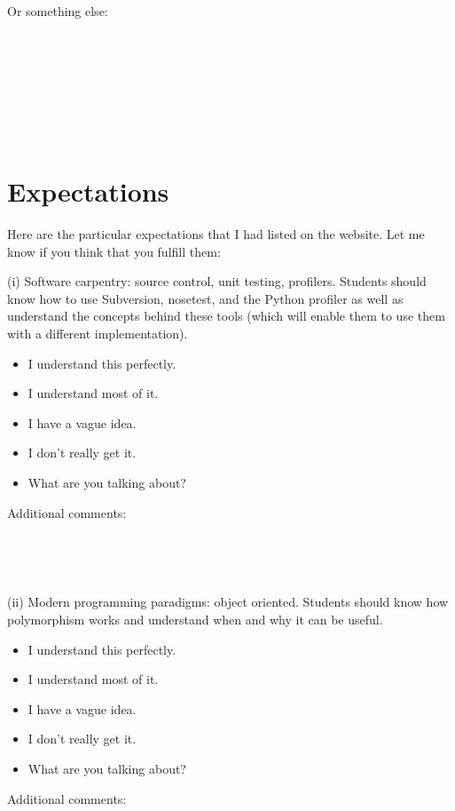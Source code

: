 \documentclass[article,twoside]{memoir}
\newcommand*{\fillunderscore}{~\hrulefill}
\newcommand*{\checkbox}{$\square$}
\begin{document}
Or something else:\par
\fillunderscore\par
\fillunderscore\par
\fillunderscore\par
\fillunderscore\par

\section{Expectations}
Here are the particular expectations that I had listed on the website. Let me know if you think that you fulfill them:

    (i) Software carpentry: source control, unit testing, profilers. Students should know how to use Subversion, nosetest, and the Python profiler as well as understand the concepts behind these tools (which will enable them to use them with a different implementation).

\begin{itemize}[\checkbox]
\item I understand this perfectly.
\item I understand most of it.
\item I have a vague idea.
\item I don't really get it.
\item What are you talking about?
\end{itemize}
Additional comments:
\fillunderscore\par
\fillunderscore\par
\fillunderscore\par

    (ii) Modern programming paradigms: object oriented. Students should know how polymorphism works and understand when and why it can be useful.
\begin{itemize}[\checkbox]
\item I understand this perfectly.
\item I understand most of it.
\item I have a vague idea.
\item I don't really get it.
\item What are you talking about?
\end{itemize}
Additional comments:
\fillunderscore\par
\fillunderscore\par
\fillunderscore\par
\end{document}
